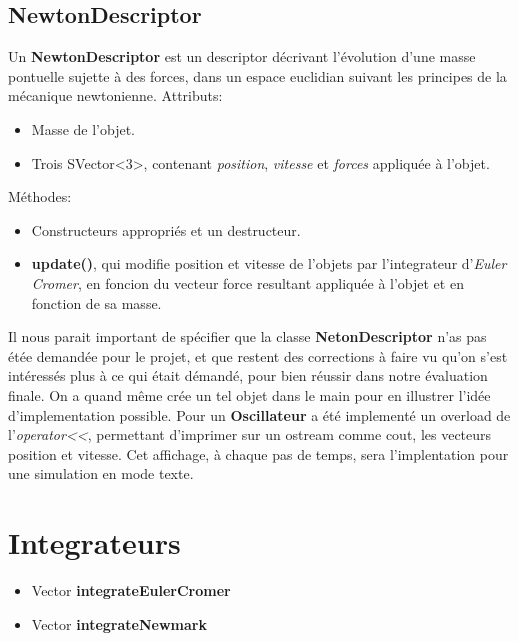 \documentclass{report}
\begin{document}
\subsection{NewtonDescriptor}
Un \textbf{NewtonDescriptor} est un descriptor décrivant l'évolution d'une masse pontuelle sujette à des forces, dans un espace euclidian
suivant les principes de la mécanique newtonienne.
Attributs:
\begin{itemize}
\item Masse de l'objet.
\item Trois SVector<3>, contenant \textit{position}, \textit{vitesse} et \textit{forces} appliquée à l'objet.
\end{itemize}
Méthodes:
\begin{itemize}
\item Constructeurs appropriés et un destructeur.
\item \textbf{update()}, qui modifie position et vitesse de l'objets par l'integrateur d'\textit{Euler Cromer}, en foncion du vecteur force resultant appliquée à l'objet
     et en fonction de sa masse.
\end{itemize}

Il nous parait important de spécifier que la classe \textbf{NetonDescriptor} n'as pas étée demandée pour le projet, et que restent des corrections à faire
vu qu'on s'est intéressés plus à ce qui était démandé, pour bien réussir dans notre évaluation finale.
On a quand même crée un tel objet dans le main pour en illustrer l'idée d'implementation possible.
Pour un \textbf{Oscillateur} a été implementé un overload de l'\textit{operator<<}, permettant d'imprimer sur un ostream comme cout, les vecteurs position et vitesse.
Cet affichage, à chaque pas de temps, sera l'implentation pour une simulation en mode texte.


\section{Integrateurs}

\begin{itemize}
\item Vector \textbf{integrateEulerCromer}
\item Vector \textbf{integrateNewmark}
\end{itemize}
\end{document}
